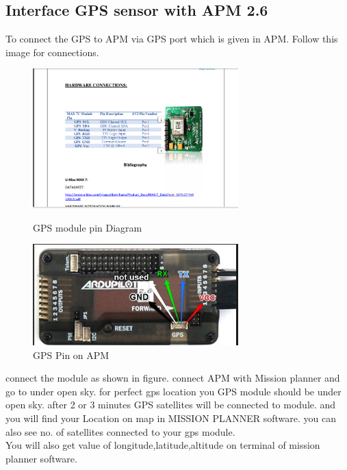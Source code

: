 \documentclass[a4paper,12pt,oneside]{book}
\begin{document}
\subsection{Interface GPS sensor with APM 2.6}
To connect the GPS to APM via GPS port which is given in APM.
		Follow this image for connections.
		\begin{figure}[H]

		\includegraphics[width = 300px]{gps2}
			\caption{GPS module pin Diagram}
		
		\includegraphics[width = 300px]{ardu2}
			\caption{GPS Pin on APM}
		\end{figure}
		connect the module as shown in figure. connect APM with Mission planner and go to under open sky.
		for perfect gps location you GPS module should be under open sky. after 2 or 3 minutes GPS satellites will be connected to module. and you will find your Location on map in MISSION PLANNER software. you can also see no. of satellites connected to your gps module. \\
		
		You will also get value of longitude,latitude,altitude on terminal of mission planner software.\newline
		
\end{document}
